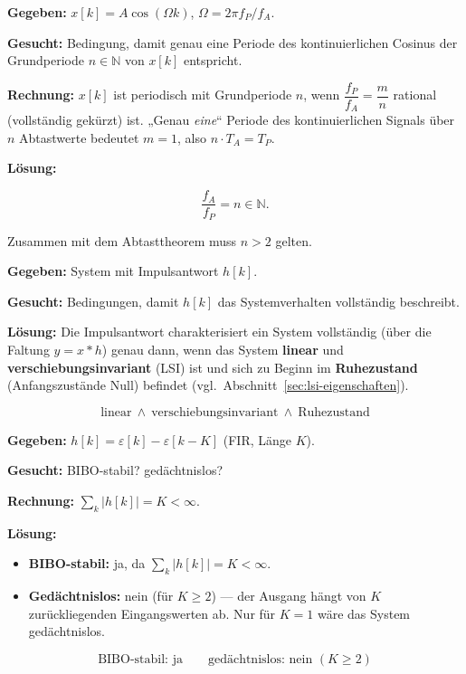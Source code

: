 \begin{beispiel}

\textbf{Gegeben:} $x[k]=A\cos(\Omega k)$, $\Omega=2\pi f_P/f_A$.

\textbf{Gesucht:} Bedingung, damit genau eine Periode des kontinuierlichen
Cosinus der Grundperiode $n\in\mathbb{N}$ von $x[k]$ entspricht.

\textbf{Rechnung:} $x[k]$ ist periodisch mit Grundperiode $n$, wenn
$\dfrac{f_P}{f_A}=\dfrac{m}{n}$ rational (vollständig gekürzt) ist. „Genau
\emph{eine}“ Periode des kontinuierlichen Signals über $n$ Abtastwerte
bedeutet $m=1$, also $n\cdot T_A=T_P$.

\textbf{Lösung:}

$$
\boxed{\frac{f_A}{f_P}=n\in\mathbb{N}.}
$$

Zusammen mit dem Abtasttheorem muss $n>2$ gelten.

\end{beispiel}

\begin{beispiel}

\textbf{Gegeben:} System mit Impulsantwort $h[k]$.

\textbf{Gesucht:} Bedingungen, damit $h[k]$ das Systemverhalten vollständig
beschreibt.

\textbf{Lösung:} Die Impulsantwort charakterisiert ein System vollständig
(über die Faltung $y=x*h$) genau dann, wenn das System \textbf{linear} und
\textbf{verschiebungsinvariant} (LSI) ist und sich zu Beginn im
\textbf{Ruhezustand} (Anfangszustände Null) befindet
(vgl.\ Abschnitt~\ref{sec:lsi-eigenschaften}).

$$
\boxed{\text{linear} \ \wedge\ \text{verschiebungsinvariant} \ \wedge\ \text{Ruhezustand}}
$$

\end{beispiel}

\begin{beispiel}

\textbf{Gegeben:} $h[k]=\varepsilon[k]-\varepsilon[k-K]$ (FIR, Länge $K$).

\textbf{Gesucht:} BIBO-stabil? gedächtnislos?

\textbf{Rechnung:} $\sum_k|h[k]|=K<\infty$.

\textbf{Lösung:}
\begin{itemize}
  \item \textbf{BIBO-stabil:} ja, da $\sum_k|h[k]|=K<\infty$.
  \item \textbf{Gedächtnislos:} nein (für $K\ge 2$) — der Ausgang hängt von
        $K$ zurückliegenden Eingangswerten ab. Nur für $K=1$ wäre das System
        gedächtnislos.
\end{itemize}

$$
\boxed{\text{BIBO-stabil: ja}\qquad\text{gedächtnislos: nein } (K\ge 2)}
$$

\end{beispiel}

